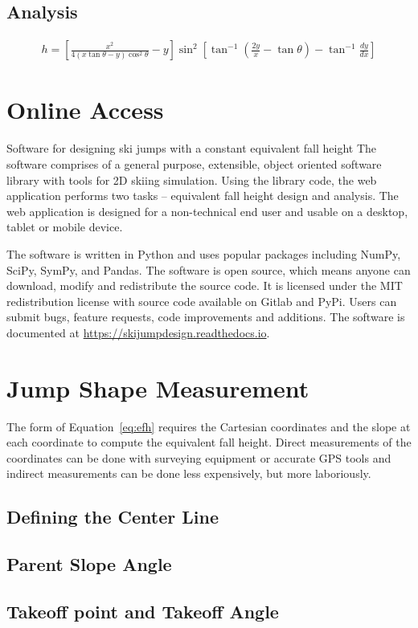 \documentclass{article}
\begin{document}
\subsection{Analysis}

\begin{align}
    h = [\frac{x^2}{4(x\tan\theta-y)\cos^{2}\theta}-y]\sin^{2}[\tan^{-1}(\frac{2y}{x}- \tan\theta)- \tan^{-1}\frac{dy}{dx}]
\end{align}

\section{Online Access}
%
Software for designing ski jumps with a constant equivalent fall height \cite{Moore2018} 
The software comprises of a general purpose, extensible, object oriented software library with tools for 2D skiing simulation. Using the library code, the web application performs two tasks -- equivalent fall height design and analysis. The web application is designed for a non-technical end user and usable on a desktop, tablet or mobile device. 
  
The software is written in Python and uses popular packages including NumPy, SciPy, SymPy, and Pandas.
The software is open source, which means anyone can download, modify and redistribute the source code. It is licensed under the MIT redistribution license with source code available on Gitlab and PyPi. Users can submit bugs, feature requests, code improvements and additions.  The software is documented at \href{https://skijumpdesign.readthedocs.io}{https://skijumpdesign.readthedocs.io}. 

\section{Jump Shape Measurement}
%
The form of Equation~\ref{eq:efh} requires the Cartesian coordinates and the slope at each coordinate to compute the equivalent fall height. Direct measurements of the coordinates can be done with surveying equipment or accurate GPS tools and indirect measurements can be done less expensively, but more laboriously.
\subsection{Defining the Center Line}
\subsection{Parent Slope Angle}
\subsection{Takeoff point and Takeoff Angle}
\end{document}
